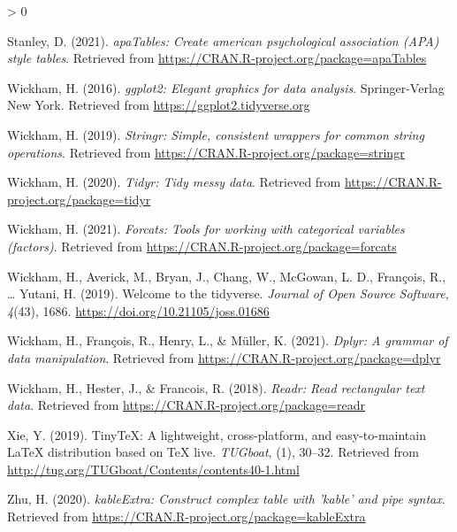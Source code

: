 \documentclass[
  english,
  man]{apa6}
\newlength{\cslhangindent}
\newenvironment{CSLReferences}[2] %
 {%
  \setlength{\parindent}{0pt}
  \ifodd #1 \everypar{\setlength{\hangindent}{\cslhangindent}}\ignorespaces\fi
  \ifnum #2 > 0
  \setlength{\parskip}{#2\baselineskip}
  \fi
 }%
 {}
\begin{document}
\begin{CSLReferences}{1}{0}
\leavevmode\hypertarget{ref-R-apaTables}{}%
Stanley, D. (2021). \emph{apaTables: Create american psychological association (APA) style tables}. Retrieved from \url{https://CRAN.R-project.org/package=apaTables}

\leavevmode\hypertarget{ref-R-ggplot2}{}%
Wickham, H. (2016). \emph{ggplot2: Elegant graphics for data analysis}. Springer-Verlag New York. Retrieved from \url{https://ggplot2.tidyverse.org}

\leavevmode\hypertarget{ref-R-stringr}{}%
Wickham, H. (2019). \emph{Stringr: Simple, consistent wrappers for common string operations}. Retrieved from \url{https://CRAN.R-project.org/package=stringr}

\leavevmode\hypertarget{ref-R-tidyr}{}%
Wickham, H. (2020). \emph{Tidyr: Tidy messy data}. Retrieved from \url{https://CRAN.R-project.org/package=tidyr}

\leavevmode\hypertarget{ref-R-forcats}{}%
Wickham, H. (2021). \emph{Forcats: Tools for working with categorical variables (factors)}. Retrieved from \url{https://CRAN.R-project.org/package=forcats}

\leavevmode\hypertarget{ref-R-tidyverse}{}%
Wickham, H., Averick, M., Bryan, J., Chang, W., McGowan, L. D., François, R., \ldots{} Yutani, H. (2019). Welcome to the {tidyverse}. \emph{Journal of Open Source Software}, \emph{4}(43), 1686. \url{https://doi.org/10.21105/joss.01686}

\leavevmode\hypertarget{ref-R-dplyr}{}%
Wickham, H., François, R., Henry, L., \& Müller, K. (2021). \emph{Dplyr: A grammar of data manipulation}. Retrieved from \url{https://CRAN.R-project.org/package=dplyr}

\leavevmode\hypertarget{ref-R-readr}{}%
Wickham, H., Hester, J., \& Francois, R. (2018). \emph{Readr: Read rectangular text data}. Retrieved from \url{https://CRAN.R-project.org/package=readr}

\leavevmode\hypertarget{ref-R-tinytex}{}%
Xie, Y. (2019). TinyTeX: A lightweight, cross-platform, and easy-to-maintain LaTeX distribution based on TeX live. \emph{TUGboat}, (1), 30--32. Retrieved from \url{http://tug.org/TUGboat/Contents/contents40-1.html}

\leavevmode\hypertarget{ref-R-kableExtra}{}%
Zhu, H. (2020). \emph{kableExtra: Construct complex table with 'kable' and pipe syntax}. Retrieved from \url{https://CRAN.R-project.org/package=kableExtra}

\end{CSLReferences}

\endgroup
\end{document}
